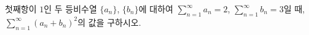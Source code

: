 첫째항이 $1$인 두 등비수열 $\{a_n\}$, $\{b_n\}$에 대하여 $\displaystyle\sum_{n=1}^{\infty}a_n=2$, $\displaystyle\sum_{n=1}^{\infty}b_n=3$일 때, $\displaystyle\sum_{n=1}^{\infty}(a_n+b_n)^2$의 값을 구하시오.
